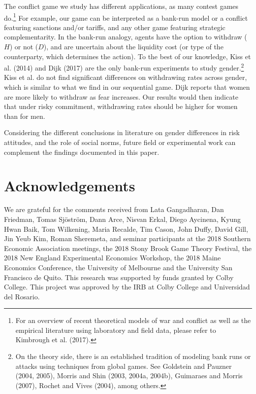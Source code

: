 \documentclass[12pt,english]{article}
\begin{document}
The conflict game we study has different applications, as many contest games do.\footnote{For an overview of recent theoretical models of war and conflict as well as the empirical literature using laboratory and field data, please refer to Kimbrough et al. (2017).}  For example, our game can be interpreted as a bank-run model or a conflict featuring sanctions and/or tariffs, and any other game featuring strategic complementarity. In the bank-run analogy, agents have the option to withdraw ($H$) or not ($D$), and are uncertain about the  liquidity cost (or type of the counterparty, which determines the action). To the best of our knowledge, Kiss et al. (2014) and Dijk (2017) are the only bank-run experiments to study gender.\footnote{On the theory side, there is an established tradition of modeling bank runs or attacks using techniques from global games. See Goldstein and Pauzner (2004, 2005), Morris and Shin (2003, 2004a, 2004b), Guimaraes and Morris (2007), Rochet and Vives (2004), among others.} Kiss et al. do not find significant differences on withdrawing rates across gender, which is similar to what we find in our sequential game.  Dijk reports that women are more likely to withdraw as fear increases. Our results would then indicate that under risky commitment, withdrawing rates should be higher for women than for men.

Considering the different conclusions in literature on gender differences in risk attitudes, and the role of social norms, future field or experimental work can complement the findings documented in this paper.

\section{Acknowledgements}
We are grateful for the comments received from Lata Gangadharan, Dan Friedman, Tomas Sj\"ostr\"om, Dann Arce, Nisvan Erkal, Diego Aycinena, Kyung Hwan Baik, Tom Wilkening, Maria Recalde, Tim Cason, John Duffy, David Gill, Jin Yeub Kim, Roman Sheremeta, and seminar participants at the 2018 Southern Economic Association meetings, the 2018 Stony Brook Game Theory Festival, the 2018 New England Experimental Economics Workshop, the 2018 Maine Economics Conference, the University of Melbourne and the University San Francisco de Quito. This research was supported by funds granted by Colby College. This project was approved by the IRB at Colby College and Universidad del Rosario.
\end{document}
